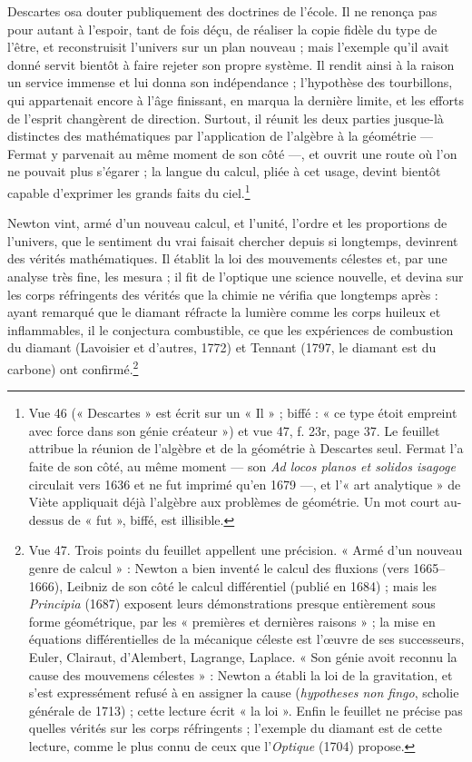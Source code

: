 \documentclass[11pt,a4paper]{article}
\begin{document}
Descartes osa douter publiquement des doctrines de l'école. Il ne renonça pas
pour autant à l'espoir, tant de fois déçu, de réaliser la copie fidèle du type
de l'être, et reconstruisit l'univers sur un plan nouveau ; mais l'exemple qu'il
avait donné servit bientôt à faire rejeter son propre système. Il rendit ainsi à
la raison un service immense et lui donna son indépendance ; l'hypothèse des
tourbillons, qui appartenait encore à l'âge finissant, en marqua la dernière
limite, et les efforts de l'esprit changèrent de direction. Surtout, il réunit
les deux parties jusque-là distinctes des mathématiques par l'application de
l'algèbre à la géométrie — Fermat y parvenait au même moment de son côté —, et ouvrit une route où l'on ne pouvait plus
s'égarer ; la langue du calcul, pliée à cet usage, devint bientôt capable
d'exprimer les grands faits du ciel.\footnote{Vue 46 (« Descartes » est écrit
sur un « Il » ; biffé : « ce type étoit empreint avec force dans son génie
créateur ») et vue 47, f. 23r, page 37. Le feuillet attribue la réunion de
l'algèbre et de la géométrie à Descartes seul. Fermat l'a faite de son côté, au
même moment — son \emph{Ad locos planos et solidos isagoge} circulait vers 1636
et ne fut imprimé qu'en 1679 —, et l'« art analytique » de Viète appliquait déjà
l'algèbre aux problèmes de géométrie. Un mot court au-dessus de « fut », biffé,
est illisible.}

Newton vint, armé d'un nouveau calcul, et l'unité, l'ordre et les proportions de
l'univers, que le sentiment du vrai faisait chercher depuis si longtemps,
devinrent des vérités mathématiques. Il établit la loi des mouvements célestes
et, par une analyse très fine, les mesura ; il fit de l'optique une science
nouvelle, et devina sur les corps réfringents des vérités que la chimie ne
vérifia que longtemps après : ayant remarqué que le diamant réfracte la lumière
comme les corps huileux et inflammables, il le conjectura combustible, ce que
les expériences de combustion du diamant (Lavoisier et d'autres, 1772) et
Tennant (1797, le diamant est du carbone) ont confirmé.\footnote{Vue 47. Trois
points du feuillet appellent une précision. « Armé d'un nouveau genre de
calcul » : Newton a bien inventé le calcul des fluxions (vers 1665--1666),
Leibniz de son côté le calcul différentiel (publié en 1684) ; mais les
\emph{Principia} (1687) exposent leurs démonstrations presque entièrement sous
forme géométrique, par les « premières et dernières raisons » ; la mise en
équations différentielles de la mécanique céleste est l'œuvre de ses
successeurs, Euler, Clairaut, d'Alembert, Lagrange, Laplace. « Son génie avoit
reconnu la cause des mouvemens célestes » : Newton a établi la loi de la
gravitation, et s'est expressément refusé à en assigner la cause (\emph{hypotheses
non fingo}, scholie générale de 1713) ; cette lecture écrit « la loi ». Enfin le
feuillet ne précise pas quelles vérités sur les corps réfringents ; l'exemple du
diamant est de cette lecture, comme le plus connu de ceux que l'\emph{Optique}
(1704) propose.}
\end{document}
